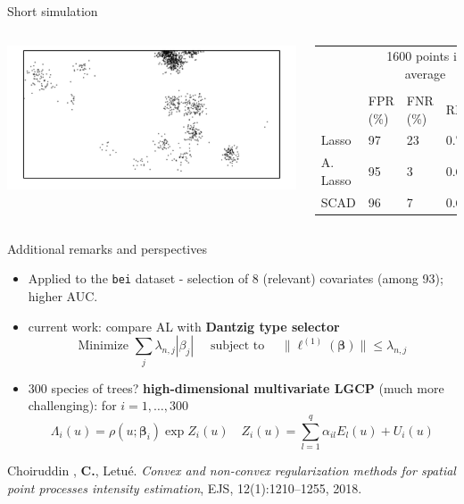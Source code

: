 \documentclass[serif]{beamer}
\newcommand{\bbeta}{\boldsymbol{\beta}}
\begin{document}
\begin{frame}{Short simulation}
\begin{columns}
\column{6cm}	
\includegraphics[scale=.07]{thomas4.jpg}
\column{6cm}
{\small 
\hspace*{-1cm}
\begin{tabular}{llll}
\hline 
 &\multicolumn{3}{c}{1600 points in average}\\
&&&\\
& FPR (\%) & FNR (\%)& RMSE  \\
\hline
Lasso &97 & 23  & 0.73\\
A. Lasso &95&3& 0.63\\
SCAD&96 & 7& 0.65\\
\hline
\end{tabular}
}
\end{columns}



\end{frame}

\begin{frame}{Additional remarks and perspectives}

\vspace*{-.3cm}

\begin{itemize}
	\item Applied to the \texttt{bei} dataset - selection of 8 (relevant) covariates (among 93);  higher AUC.
	\item current work: compare AL with {\bf Dantzig type selector}
\[
	\text{Minimize }\sum_{j} \lambda_{n,j} |\beta_j| \quad\text{ subject to } \quad\| \ell^{(1)}(\bbeta)\| \le \lambda_{n,j}
 \]
 \item  300 species of trees?  {\bf high-dimensional multivariate LGCP} (much more challenging): for $i=1,\dots,300$
\[
	\Lambda_i(u) = \rho(u;\bbeta_i) \exp Z_i(u) \quad Z_i(u) =  \sum_{l=1}^q \alpha_{il} E_{l}(u) + U_i(u)
\]

\end{itemize}

\hrulefill

{\scriptsize Choiruddin , {\bf C.}, Letué. {\it Convex and non-convex regularization methods for spatial point processes intensity estimation}, EJS, 12(1):1210–1255, 2018.}
\end{frame}
\end{document}
